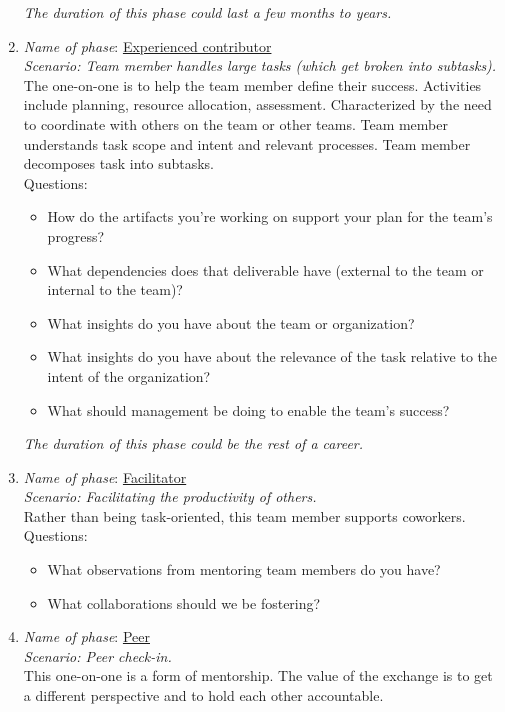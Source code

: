 \begin{enumerate}
\begin{itemize}
    \end{itemize}
\textit{The duration of this phase could last a few months to years.}
    \item \textit{Name of phase}: \underline{Experienced contributor}\\
    \textit{Scenario: Team member handles large tasks (which get broken into subtasks). }\\
    The one-on-one is to help the team member define their success. Activities include planning, resource allocation, assessment. Characterized by the need to coordinate with others on the team or other teams. Team member understands task scope and intent and relevant processes. Team member decomposes task into subtasks.\\
    Questions:
    \begin{itemize}
        \item How do the artifacts you're working on support your plan for the team's progress?
        \item What dependencies does that deliverable have (external to the team or internal to the team)?
        \item What insights do you have about the team or organization?
        \item What insights do you have about the relevance of the task relative to the intent of the organization?
        \item What should management be doing to enable the team's success?
    \end{itemize}
\textit{The duration of this phase could be the rest of a career.}
    \item \textit{Name of phase}: \underline{Facilitator}\\
    \textit{Scenario: Facilitating the productivity of others.}\\
    Rather than being task-oriented, this team member supports coworkers. \\
    Questions:
    \begin{itemize}
        \item What observations from mentoring team members do you have?
        \item What collaborations should we be fostering?
    \end{itemize}
    \item \textit{Name of phase}: \underline{Peer}\\
    \textit{Scenario: Peer check-in.}\\ 
    This one-on-one is a form of mentorship. The value of the exchange is to get a different perspective and to hold each other accountable.
\end{enumerate}

